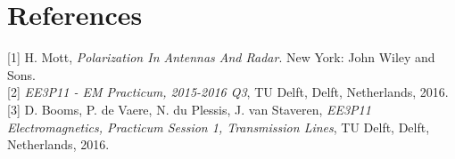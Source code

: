 \documentclass[11pt,a4paper]{article}
\begin{document}
\section{References}
{[1]} H. Mott, \textit{Polarization In Antennas And Radar}. New York: John Wiley and Sons.\\
{[2]} \textit{EE3P11 - EM Practicum, 2015-2016 Q3}, TU Delft, Delft, Netherlands, 2016. \\
{[3]} D. Booms, P. de Vaere, N. du Plessis, J. van Staveren, \textit{EE3P11 Electromagnetics, Practicum Session 1, Transmission Lines}, TU Delft, Delft, Netherlands, 2016.
\end{document}

